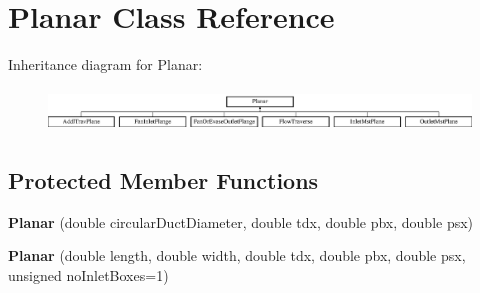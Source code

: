 \hypertarget{class_planar}{}\section{Planar Class Reference}
\label{class_planar}
Inheritance diagram for Planar\+:\begin{figure}[H]
\begin{center}
\leavevmode
\includegraphics[height=1.138211cm]{d2/ddc/class_planar}
\end{center}
\end{figure}
\subsection*{Protected Member Functions}
\begin{DoxyCompactItemize}
\item 
\mbox{\label{class_planar_a3b5c2c6a72561a29012c7793211ce7e0}} 
{\bfseries Planar} (double circular\+Duct\+Diameter, double tdx, double pbx, double psx)
\item 
\mbox{\label{class_planar_a69f208c5a6c651921199c0a296a4e6a5}} 
{\bfseries Planar} (double length, double width, double tdx, double pbx, double psx, unsigned no\+Inlet\+Boxes=1)
\end{DoxyCompactItemize}
